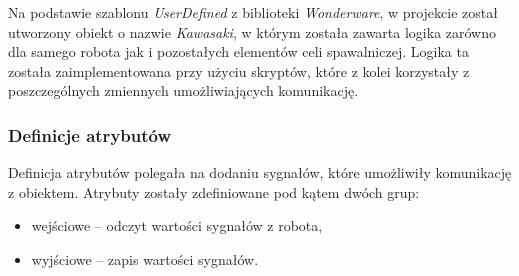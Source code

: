 Na podstawie szablonu \textit{UserDefined} z biblioteki \textit{Wonderware}, w projekcie został utworzony obiekt o nazwie \textit{Kawasaki}, w którym została zawarta logika zarówno dla samego robota jak i pozostałych elementów celi spawalniczej. Logika ta została zaimplementowana przy użyciu skryptów, które z kolei korzystały z poszczególnych zmiennych umożliwiających komunikację. 

\subsubsection{Definicje atrybutów}

Definicja atrybutów polegała na dodaniu sygnałów, które umożliwiły komunikację z obiektem. Atrybuty zostały zdefiniowane pod kątem dwóch grup:

\begin{itemize}
	\item wejściowe – odczyt wartości sygnałów z robota,
	\item wyjściowe – zapis wartości sygnałów.
\end{itemize}

